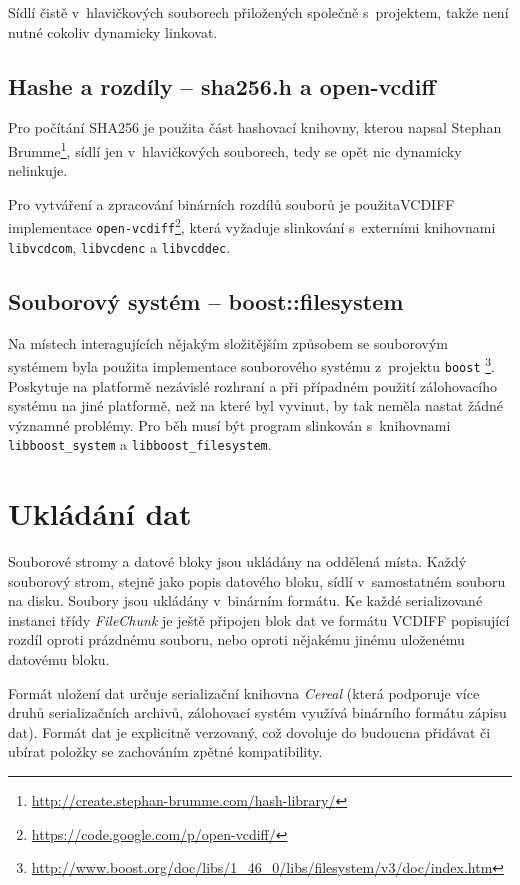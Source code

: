 Sídlí čistě v~hlavičkových souborech přiložených společně s~projektem, takže
není nutné cokoliv dynamicky linkovat.

\subsection*{Hashe a rozdíly -- sha256.h a open-vcdiff}

Pro počítání \gls{SHA256} je použita část hashovací knihovny, kterou napsal
Stephan Brumme\footnote{\url{http://create.stephan-brumme.com/hash-library/}},
sídlí jen v~hlavičkových souborech, tedy se opět nic dynamicky nelinkuje.

Pro vytváření a zpracování binárních rozdílů souborů je použita\gls{VCDIFF}
implementace \texttt{open-vcdiff}\footnote{\url{https://code.google.com/p/open-vcdiff/}},
která vyžaduje slinkování s~externími knihovnami \texttt{libvcdcom}, \texttt{libvcdenc}
a \texttt{libvcddec}.

\subsection*{Souborový systém -- boost::filesystem}

Na místech interagujících nějakým složitějším způsobem se souborovým systémem
byla použita implementace souborového systému z~\Cpp projektu \texttt{boost}%
\footnote{\url{http://www.boost.org/doc/libs/1_46_0/libs/filesystem/v3/doc/index.htm}}.
Poskytuje na platformě nezávislé rozhraní a při případném použití zálohovacího
systému na jiné platformě, než na které byl vyvinut, by tak neměla nastat žádné
významné problémy. Pro běh musí být program slinkován s~knihovnami
\texttt{libboost\_system} a \texttt{libboost\_filesystem}.

\section{Ukládání dat}

Souborové stromy a datové bloky jsou ukládány na oddělená místa. Každý souborový
strom, stejně jako popis datového bloku, sídlí v~samostatném souboru na disku.
Soubory jsou ukládány v~binárním formátu. Ke každé serializované instanci třídy
{\it FileChunk} je ještě připojen blok dat ve formátu \gls{VCDIFF} popisující
rozdíl oproti prázdnému souboru, nebo oproti nějakému jinému uloženému datovému
bloku.

Formát uložení dat určuje serializační knihovna {\it Cereal} (která podporuje
více druhů serializačních archivů, zálohovací systém využívá binárního formátu
zápisu dat). Formát dat je explicitně verzovaný, což dovoluje do budoucna
přidávat či ubírat položky se zachováním zpětné kompatibility.

